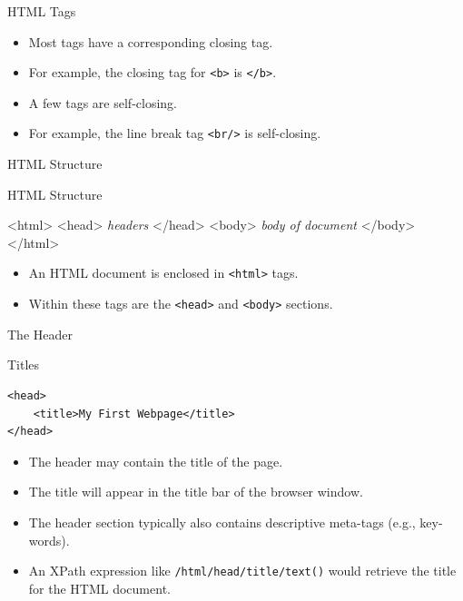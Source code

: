 \documentclass[svgnames]{beamer}
\begin{document}
\begin{frame}[fragile]{HTML Tags}
\begin{itemize}
	\item Most tags have a corresponding closing tag.
	\item For example, the closing tag for \texttt{<b>} is \texttt{</b>}.
	\item A few tags are self-closing.
	\item For example, the line break tag \texttt{<br/>} is self-closing.
\end{itemize}
\end{frame}

\begin{frame}[fragile]{HTML Structure}
\small
\begin{block}{HTML Structure}
\begin{semiverbatim}
<html>
    <head>
        \emph{headers}
    </head>
    <body>
        \emph{body of document}
    </body>
</html>
\end{semiverbatim}
\end{block}
\normalsize
\begin{itemize}
	\item An HTML document is enclosed in \texttt{<html>} tags.
	\item Within these tags are the \texttt{<head>} and \texttt{<body>} sections.
\end{itemize}
\end{frame}

\begin{frame}[fragile]{The Header}
\small
\begin{block}{Titles}
\begin{verbatim}
<head>
    <title>My First Webpage</title>
</head>
\end{verbatim}
\end{block}
\normalsize
\begin{itemize}
	\item The header may contain the title of the page.
	\item The title will appear in the title bar of the browser window.
	\item The header section typically also contains descriptive meta-tags (e.g., key-words).
	\item An XPath expression like {\tt /html/head/title/text()} would retrieve the title for the HTML document.
\end{itemize}
\end{frame}
\end{document}
